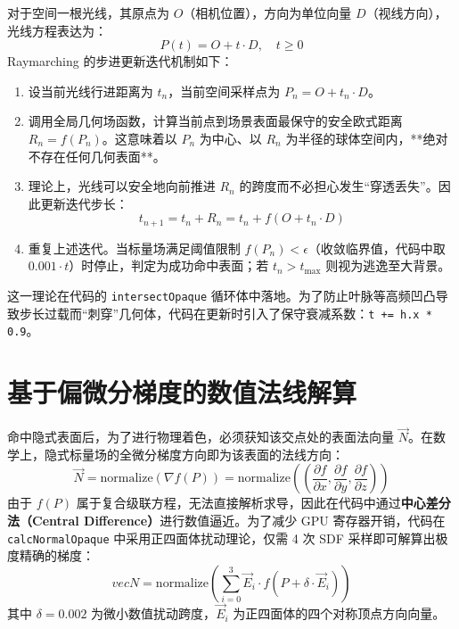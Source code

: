 \documentclass[11pt, a4paper, oneside]{report}
\newcommand{\keyword}[1]{\textbf{#1}}
\newcommand{\code}[1]{\texttt{#1}}
\begin{document}
对于空间一根光线，其原点为 $O$（相机位置），方向为单位向量 $D$（视线方向），光线方程表达为：
\begin{equation}
P(t) = O + t \cdot D, \quad t \ge 0
\end{equation}
Raymarching 的步进更新迭代机制如下：
\begin{enumerate}
    \item 设当前光线行进距离为 $t_n$，当前空间采样点为 $P_n = O + t_n \cdot D$。
    \item 调用全局几何场函数，计算当前点到场景表面最保守的安全欧式距离 $R_n = f(P_n)$。这意味着以 $P_n$ 为中心、以 $R_n$ 为半径的球体空间内，**绝对不存在任何几何表面**。
    \item 理论上，光线可以安全地向前推进 $R_n$ 的跨度而不必担心发生“穿透丢失”。因此更新迭代步长：
    \begin{equation}
    t_{n+1} = t_n + R_n = t_n + f(O + t_n \cdot D)
    \end{equation}
    \item 重复上述迭代。当标量场满足阈值限制 $f(P_n) < \epsilon$（收敛临界值，代码中取 $0.001 \cdot t$）时停止，判定为成功命中表面；若 $t_n > t_{\text{max}}$ 则视为逃逸至大背景。
\end{enumerate}
这一理论在代码的 \code{intersectOpaque} 循环体中落地。为了防止叶脉等高频凹凸导致步长过载而“刺穿”几何体，代码在更新时引入了保守衰减系数：\code{t += h.x * 0.9}。

\section{基于偏微分梯度的数值法线解算}
命中隐式表面后，为了进行物理着色，必须获知该交点处的表面法向量 $\vec{N}$。在数学上，隐式标量场的全微分梯度方向即为该表面的法线方向：
\begin{equation}
\vec{N} = \text{normalize}\left( \nabla f(P) \right) = \text{normalize}\left( \left( \frac{\partial f}{\partial x}, \frac{\partial f}{\partial y}, \frac{\partial f}{\partial z} \right) \right)
\end{equation}
由于 $f(P)$ 属于复合级联方程，无法直接解析求导，因此在代码中通过\keyword{中心差分法（Central Difference）}进行数值逼近。为了减少 GPU 寄存器开销，代码在 \code{calcNormalOpaque} 中采用正四面体扰动理论，仅需 4 次 SDF 采样即可解算出极度精确的梯度：
\begin{equation}
vec{N} = \text{normalize}\left( \sum_{i=0}^{3} \vec{E}_i \cdot f(P + \delta \cdot \vec{E}_i) \right)
\end{equation}
其中 $\delta = 0.002$ 为微小数值扰动跨度，$\vec{E}_i$ 为正四面体的四个对称顶点方向向量。
\end{document}
